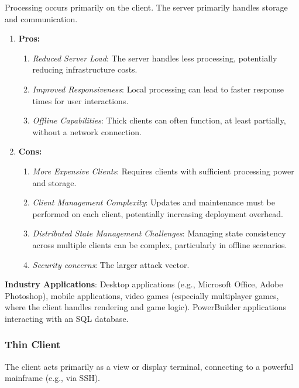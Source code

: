 Processing occurs primarily on the client. The server primarily handles storage and communication.
\begin{enumerate}
\item \textbf{Pros:}
	\begin{enumerate}[itemsep=1pt]
	    \item \textit{Reduced Server Load}:  The server handles less processing, potentially reducing infrastructure costs.
	    \item \textit{Improved Responsiveness}:  Local processing can lead to faster response times for user interactions.
	    \item \textit{Offline Capabilities}:  Thick clients can often function, at least partially, without a network connection.
	\end{enumerate}

\item \textbf{Cons:}
\begin{enumerate}[itemsep=1pt]
    \item \textit{More Expensive Clients}:  Requires clients with sufficient processing power and storage.
    \item \textit{Client Management Complexity}:  Updates and maintenance must be performed on each client, potentially increasing deployment overhead.
    \item \textit{Distributed State Management Challenges}:  Managing state consistency across multiple clients can be complex, particularly in offline scenarios.
     \item \textit{Security concerns}: The larger attack vector. 
\end{enumerate}
\end{enumerate}

\textbf{Industry Applications}:  Desktop applications (e.g., Microsoft Office, Adobe Photoshop), mobile applications, video games (especially multiplayer games, where the client handles rendering and game logic).  PowerBuilder applications interacting with an SQL database.

\subsubsection{Thin Client}

The client acts primarily as a view or display terminal, connecting to a powerful mainframe (e.g., via SSH).

